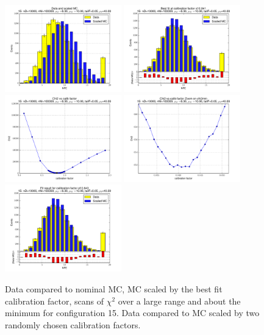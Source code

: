 
 \begin{figure}[htbp] \begin{center} 
\includegraphics[width=0.45\textwidth]{../FIGURES/15/FIG_Data_and_scaled_MC.pdf} 
\includegraphics[width=0.45\textwidth]{../FIGURES/15/FIG_Best_fit_at_calibration_factor_of_0_841.pdf} 
\includegraphics[width=0.45\textwidth]{../FIGURES/15/FIG_Chi2_vs_calib_factor.pdf} 
\includegraphics[width=0.45\textwidth]{../FIGURES/15/FIG_Chi2_vs_calib_factor_Zoom_on_chi2min.pdf} 
\includegraphics[width=0.45\textwidth]{../FIGURES/15/FIG_Fit_result_for_calibration_factor_of_0_843.pdf} 
\caption{Data compared to nominal MC, MC scaled by the best fit calibration factor, scans of $\chi^2$ over a large range and about the minimum for configuration 15. Data compared to MC scaled by two randomly chosen calibration factors.} 
\label{tab:best_15} 
\end{center} \end{figure} 

